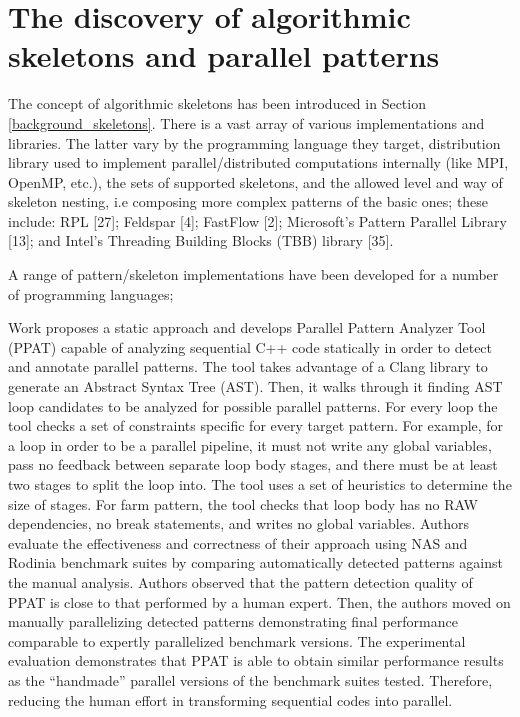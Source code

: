 \section{The discovery of algorithmic skeletons and parallel patterns}
\label{related_work_as_and_pp}
\quad The concept of algorithmic skeletons has been introduced in Section \ref{background_skeletons}. There is a vast array of various implementations and libraries. The latter vary by the programming language they target, distribution library used to implement parallel/distributed computations internally (like MPI, OpenMP, etc.), the sets of supported skeletons, and the allowed level and way of skeleton nesting, i.e composing more complex patterns of the basic ones; these include: RPL [27]; Feldspar [4]; FastFlow [2]; Microsoft’s Pattern Parallel Library [13]; and Intel’s Threading Building Blocks (TBB) library [35].
\newline\null

A range of pattern/skeleton implementations
have been developed for a number of programming languages; 


\quad Work \cite{skeletons-static} proposes a static approach and develops Parallel Pattern Analyzer Tool (PPAT) capable of analyzing sequential C++ code statically in order to detect and annotate parallel patterns. The tool takes advantage of a Clang library to generate an Abstract Syntax Tree (AST). Then, it walks through it finding AST loop candidates to be analyzed for possible parallel patterns. For every loop the tool checks a set of constraints specific for every target pattern. For example, for a loop in order to be a parallel pipeline, it must not write any global variables, pass no feedback between separate loop body stages, and there must be at least two stages to split the loop into. The tool uses a set of heuristics to determine the size of stages. For farm pattern, the tool checks that loop body has no RAW dependencies, no break statements, and writes no global variables. Authors evaluate the effectiveness and correctness of their approach using NAS and Rodinia benchmark suites by comparing automatically detected patterns against the manual analysis. Authors observed that the pattern detection quality of PPAT is close to that performed by a human expert. Then, the authors moved on manually parallelizing detected patterns demonstrating final performance comparable to expertly parallelized benchmark versions. The experimental evaluation demonstrates that PPAT is able to obtain similar performance results as the “handmade” parallel versions of the benchmark suites tested. Therefore, reducing the human effort in transforming sequential codes into parallel.

